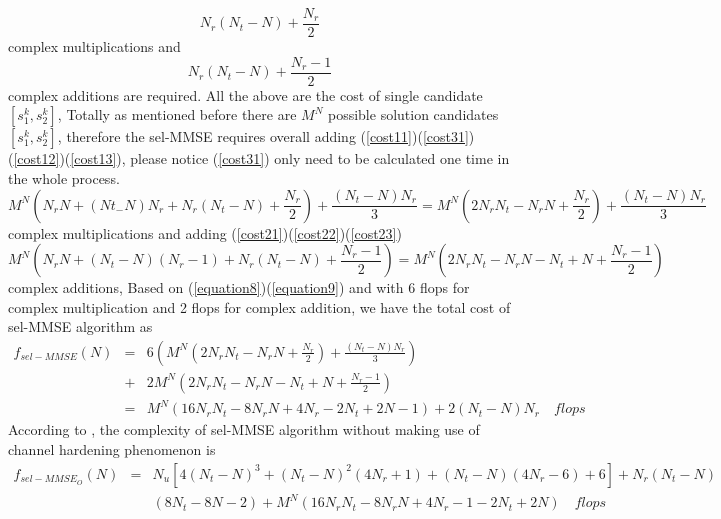 \documentclass[12pt,a4paper,final]{article}
\begin{document}
\begin{spacing}{2.5}
 \begin{equation}
  N_{r}(N_{t}-N)+\frac{N_{r}}{2}\label{cost13}
\end{equation}  
 complex multiplications and
 \begin{equation}
   N_{r}(N_{t}-N)+\frac{N_{r}-1}{2}\label{cost23}
 \end{equation}
complex additions are required. All the above are the cost of single candidate  $[s_{1}^{k},s_{2}^{k}]$, Totally as mentioned before there are $M^N$ possible solution candidates $[s_{1}^{k},s_{2}^{k}]$, therefore the sel-MMSE requires overall adding (\ref{cost11})(\ref{cost31})(\ref{cost12})(\ref{cost13}), please notice (\ref{cost31}) only need to be calculated one time in the whole process.
\begin{equation}
M^{N}(N_rN+(Nt_-N)N_r+N_r(N_t-N)+\frac{N_r}{2})+\frac{(N_{t}-N)N_{r}}{3}=M^{N}(2N_{r}N_{t}-N_{r}N+\frac{N_r}{2})+\frac{(N_{t}-N)N_r}{3}\label{equation8}
\end{equation}
complex multiplications and adding (\ref{cost21})(\ref{cost22})(\ref{cost23})
\begin{equation}
M^{N}(N_rN+(N_t-N)(N_r-1)+N_r(N_t-N)+\frac{N_r-1}{2})=M^{N}(2N_{r}N_{t}-N_{r}N-N_{t}+N+\frac{N_{r}-1}{2})\label{equation9}
\end{equation}
complex additions, Based on (\ref{equation8})(\ref{equation9}) and with 6 flops for complex multiplication and 2 flops for complex addition, we have the total cost of sel-MMSE algorithm as
\begin{eqnarray}
\nonumber
f_{sel-MMSE}(N) &=& 6(M^{N}(2N_{r}N_{t}-N_{r}N+\frac{N_r}{2})+\frac{(N_{t}-N)N_r}{3})\\  
&+&2M^{N}(2N_{r}N_{t}-N_{r}N-N_{t}+N+\frac{N_{r}-1}{2})\\
\nonumber 
&=&M^{N}(16N_{r}N_{t}-8N_{r}N+4N_{r}-2N_{t}+2N-1)+2(N_{t}-N)N_{r}\quad flops  \label{equation10}
\end{eqnarray}
According to \cite{2}, the complexity of sel-MMSE algorithm without making use of channel hardening phenomenon is 
\begin{eqnarray}
\nonumber
f_{sel-MMSE_{O}}(N)&=&  N_{u}[4(N_t-N)^3+(N_t-N)^2(4N_r+1)+(N_t-N)(4N_r-6)+6]+N_r(N_t-N)\\
&&(8N_t-8N-2)+M^{N}(16N_{r}N_{t}-8N_{r}N+4N_{r}-1-2N_{t}+2N)\quad flops \label{equation52}
\end{eqnarray}

\end{spacing}
\end{document}
